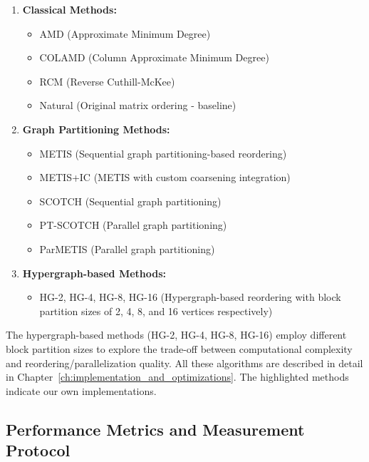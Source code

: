 \begin{enumerate}
   \item \textbf{Classical Methods:}
   \begin{itemize}[noitemsep,topsep=0pt]
      \item AMD (Approximate Minimum Degree)
      \item COLAMD (Column Approximate Minimum Degree)  
      \item RCM (Reverse Cuthill-McKee)
      \item Natural (Original matrix ordering - baseline)
   \end{itemize}
   
   \item \textbf{Graph Partitioning Methods:}
   \begin{itemize}[noitemsep,topsep=0pt]
      \item METIS (Sequential graph partitioning-based reordering)
      \item \colorbox{yellow!60}{METIS+IC} (METIS with custom coarsening integration)
      \item SCOTCH (Sequential graph partitioning)
      \item PT-SCOTCH (Parallel graph partitioning)
      \item ParMETIS (Parallel graph partitioning)
   \end{itemize}
   
   \item \textbf{Hypergraph-based Methods:}
   \begin{itemize}[noitemsep,topsep=0pt]
      \item \colorbox{yellow!60}{HG-2}, \colorbox{yellow!60}{HG-4}, \colorbox{yellow!60}{HG-8}, \colorbox{yellow!60}{HG-16} (Hypergraph-based reordering with block partition sizes of 2, 4, 8, and 16 vertices respectively)
   \end{itemize}
\end{enumerate}

The hypergraph-based methods (HG-2, HG-4, HG-8, HG-16) employ different block partition sizes to explore the trade-off between computational complexity and reordering/parallelization quality. All these algorithms are described in detail in Chapter~\ref{ch:implementation_and_optimizations}. The \colorbox{yellow!60}{highlighted methods} indicate our own implementations.

\subsection{Performance Metrics and Measurement Protocol}

